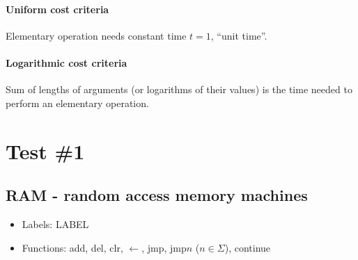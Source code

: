 \documentclass{article}
\begin{document}
\begin{multicols}{2}

\paragraph{Uniform cost criteria}
Elementary operation needs constant time $t = 1$, ``unit time''.

\paragraph{Logarithmic cost criteria}
Sum of lengths of arguments (or logarithms of their values) is the time needed to perform
an elementary operation.

\end{multicols}

\pagebreak[4]

\section{Test \#1}

\subsection{RAM - random access memory machines}

\begin{itemize}[noitemsep,nolistsep]
  \item Labels: LABEL
  \item Functions: add, del, clr, $\leftarrow$, jmp, jmp$n$ ($n \in \Sigma$), continue
\end{itemize}


% 
\end{document}
